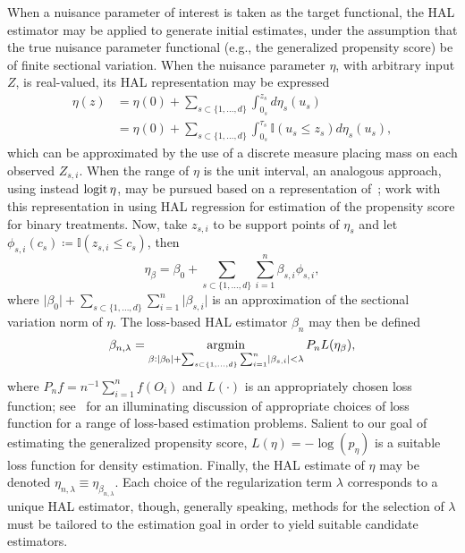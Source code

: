 When a nuisance parameter of interest is taken as the target functional, the HAL
estimator may be applied to generate initial estimates, under the assumption
that the true nuisance parameter functional (e.g., the generalized propensity
score) be of finite sectional variation. When the nuisance parameter $\eta$,
with arbitrary input $Z$, is real-valued, its HAL representation may be
expressed
\begin{align}\label{eq:hal}
  \eta(z) &= \eta(0) + \sum_{s \subset\{1,\ldots,d\}} \int_{0_s}^{z_s} d
  \eta_s(u_s) \nonumber \\ & = \eta(0) + \sum_{s \subset\{1,\ldots,d\}}
  \int_{0_s}^{\tau_s} \mathbb{I}(u_s \leq z_s) d \eta_s(u_s),
\end{align}
which can be approximated by the use of a discrete measure placing mass on each
observed $Z_{s,i}$. When the range of $\eta$ is the unit interval, an analogous
approach, using instead $\operatorname{logit} \eta$, may be pursued based on a representation
of~\citet{gill1995inefficient}; \citet{ertefaie2020nonparametric} work with this
representation in using HAL regression for estimation of the propensity score
for binary treatments. Now, take $z_{s,i}$ to be support points of $\eta_s$ and
let $\phi_{s,i}(c_s) \coloneqq \mathbb{I}(z_{s,i} \leq c_s)$, then
\begin{equation*}
 \eta_\beta = \beta_0 + \sum_{s \subset\{1,\ldots,d\}} \sum_{i=1}^{n}
   \beta_{s,i} \phi_{s,i},
\end{equation*}
where $\lvert \beta_0 \rvert + \sum_{s \subset\{1,\ldots,d\}} \sum_{i=1}^{n}
\lvert \beta_{s,i} \rvert$ is an approximation of the sectional variation norm
of $\eta$. The loss-based HAL estimator $\beta_n$ may then be defined
\begin{equation*}
  \beta_{n, \lambda} = \operatorname*{\arg\!\min}_{\beta: \lvert \beta_0 \rvert + \sum_{s
  \subset\{1,\ldots,d\}} \sum_{i=1}^{n} \lvert \beta_{s,i} \rvert <\lambda} P_n
  L(\eta_{\beta}),
\end{equation*}
where $P_n f = n^{-1} \sum_{i = 1}^n f(O_i)$ and $L(\cdot)$ is an appropriately
chosen loss function; see~\citet{dudoit2005asymptotics} for an illuminating
discussion of appropriate choices of loss function for a range of loss-based
estimation problems. Salient to our goal of estimating the generalized
propensity score, $L(\eta) = -\log(p_{\eta})$ is a suitable loss function for
density estimation. Finally, the HAL estimate of $\eta$ may be denoted
$\eta_{n,\lambda} \equiv \eta_{\beta_{n, \lambda}}$. Each choice of the
regularization term $\lambda$ corresponds to a unique HAL estimator, though,
generally speaking, methods for the selection of $\lambda$ must be tailored to
the estimation goal in order to yield suitable candidate estimators.

